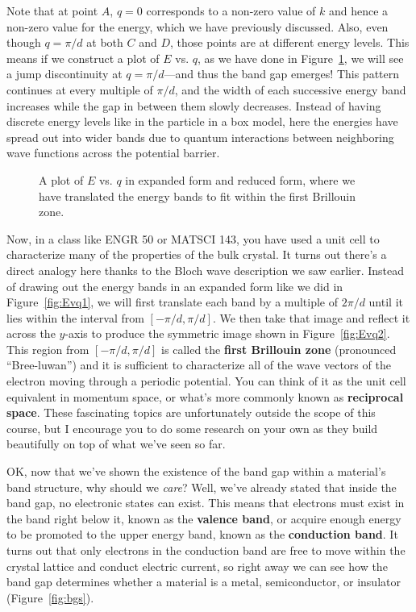 Note that at point $A$, $q=0$ corresponds to a non-zero value of $k$ and hence a non-zero value for the energy, which we have previously discussed. Also, even though $q=\pi/d$ at both $C$ and $D$, those points are at different energy levels. This means if we construct a plot of $E$ vs. $q$, as we have done in Figure~\ref{fig:Evq}, we will see a jump discontinuity at $q=\pi/d$---and thus the band gap emerges! This pattern continues at every multiple of $\pi/d$, and the width of each successive energy band increases while the gap in between them slowly decreases. Instead of having discrete energy levels like in the particle in a box model, here the energies have spread out into wider bands due to quantum interactions between neighboring wave functions across the potential barrier.

\begin{figure}[!h]
	\centering
	\hfill
	\caption{A plot of $E$ vs. $q$ in \protect{} expanded form and \protect{} reduced form, where we have translated the energy bands to fit within the first Brillouin zone.}
	\label{fig:Evq}
\end{figure}

Now, in a class like ENGR 50 or MATSCI 143, you have used a unit cell to characterize many of the properties of the bulk crystal. It turns out there's a direct analogy here thanks to the Bloch wave description we saw earlier. Instead of drawing out the energy bands in an expanded form like we did in Figure~\ref{fig:Evq1}, we will first translate each band by a multiple of $2\pi/d$ until it lies within the interval from $[-\pi/d, \pi/d]$. We then take that image and reflect it across the $y$-axis to produce the symmetric image shown in Figure~\ref{fig:Evq2}. This region from $[-\pi/d, \pi/d]$ is called the \textbf{first Brillouin zone} (pronounced ``Bree-luwan'') and it is sufficient to characterize all of the wave vectors of the electron moving through a periodic potential. You can think of it as the unit cell equivalent in momentum space, or what's more commonly known as \textbf{reciprocal space}. These fascinating topics are unfortunately outside the scope of this course, but I encourage you to do some research on your own as they build beautifully on top of what we've seen so far. \par 

OK, now that we've shown the existence of the band gap within a material's band structure, why should we \emph{care}? Well, we've already stated that inside the band gap, no electronic states can exist. This means that electrons must exist in the band right below it, known as the \textbf{valence band}, or acquire enough energy to be promoted to the upper energy band, known as the \textbf{conduction band}. It turns out that only electrons in the conduction band are free to move within the crystal lattice and conduct electric current, so right away we can see how the band gap determines whether a material is a metal, semiconductor, or insulator (Figure~\ref{fig:bgs}).

